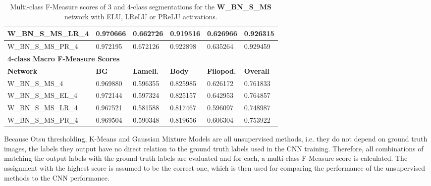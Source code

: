 \begin {table}
\begin{flushleft}
\begin {tabular}[!htb]{|l|l|l|l|l|l|}
			W\_BN\_S\_MS\_LR\_4& 0.970666& 0.662726& 0.919516& 0.626966& 0.926315 \\ \hline
			W\_BN\_S\_MS\_PR\_4& 0.972195& 0.672126& 0.922898& 0.635264& 0.929459 \\ \hline
			\multicolumn{6}{|l|}{\textbf{4-class Macro F-Measure Scores}} \\ \hline
			\textbf{Network}& \textbf{BG}& \textbf{Lamell.}& \textbf{Body}& \textbf{Filopod.}& \textbf{Overall} \\ \hline
			W\_BN\_S\_MS\_4& 0.969880& 0.596355& \cellcolor{green!25}0.825985& 0.626172& 0.761833 \\ \hline
			W\_BN\_S\_MS\_EL\_4& \cellcolor{green!25}0.972144& \cellcolor{green!25}0.597324& 0.825157& \cellcolor{green!25}0.642953& \cellcolor{green!25}0.764857 \\ \hline
			W\_BN\_S\_MS\_LR\_4& 0.967521& 0.581588& 0.817467& 0.596097& 0.748987 \\ \hline
			W\_BN\_S\_MS\_PR\_4& 0.969504& 0.590348& 0.819656& 0.606304& 0.753922 \\ \hline
		\end {tabular}
	\end {flushleft}
\caption[Multi-class F-Measure scores for networks with different activation functions.]{Multi-class F-Measure scores of 3 and 4-class segmentations for the \textbf{W\_BN\_S\_MS} network with ELU, LReLU or PReLU activations.}
\label{tab:results5}
\end {table}


\noindent Because Otsu thresholding, K-Means and Gaussian Mixture Models are all unsupervised methods, i.e. they do not depend on ground truth images, the labels they output have no direct relation to the ground truth labels used in the CNN training. Therefore, all combinations of matching the output labels with the ground truth labels are evaluated and for each, a multi-class F-Measure score is calculated. The assignment with the highest score is assumed to be the correct one, which is then used for comparing the performance of the unsupervised methods to the CNN performance.\\


